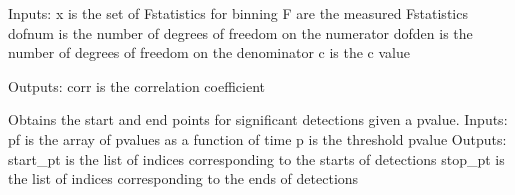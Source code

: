 \documentclass[letterpaper,10pt,english]{sphinxmanual}
\begin{document}
\begin{fulllineitems}
\begin{fulllineitems}
Inputs:
\sphinxhyphen{} x is the set of F\sphinxhyphen{}statistics for binning
\sphinxhyphen{} F are the measured F\sphinxhyphen{}statistics
\sphinxhyphen{} dofnum is the number of degrees of freedom on the numerator
\sphinxhyphen{} dofden is the number of degrees of freedom on the denominator
\sphinxhyphen{} c is the c value

Outputs:
\sphinxhyphen{} corr is the correlation coefficient

\end{fulllineitems}


\begin{fulllineitems}
\label{\detokenize{infrapy.database.taskbase:infrapy.database.taskbase.fdet.FDet.event_detection}}
\end{fulllineitems}


\begin{fulllineitems}
\label{\detokenize{infrapy.database.taskbase:infrapy.database.taskbase.fdet.FDet.event_detection2}}
\end{fulllineitems}


\begin{fulllineitems}
\label{\detokenize{infrapy.database.taskbase:infrapy.database.taskbase.fdet.FDet.getdet}}
Obtains the start and end points for significant detections given a p\sphinxhyphen{}value.
Inputs:
\sphinxhyphen{} pf is the array of p\sphinxhyphen{}values as a function of time
\sphinxhyphen{} p is the threshold p\sphinxhyphen{}value
Outputs:
\sphinxhyphen{} start\_pt is the list of indices corresponding to the starts of detections
\sphinxhyphen{} stop\_pt is the list of indices corresponding to the ends of detections

\end{fulllineitems}


\end{fulllineitems}
\end{document}
